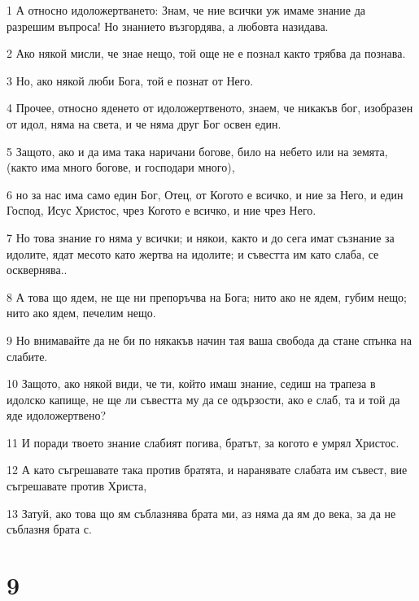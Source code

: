 \par 1 А относно идоложертването: Знам, че ние всички уж имаме знание да разрешим въпроса! Но знанието възгордява, а любовта назидава.
\par 2 Ако някой мисли, че знае нещо, той още не е познал както трябва да познава.
\par 3 Но, ако някой люби Бога, той е познат от Него.
\par 4 Прочее, относно яденето от идоложертвеното, знаем, че никакъв бог, изобразен от идол, няма на света, и че няма друг Бог освен един.
\par 5 Защото, ако и да има така наричани богове, било на небето или на земята, (както има много богове, и господари много),
\par 6 но за нас има само един Бог, Отец, от Когото е всичко, и ние за Него, и един Господ, Исус Христос, чрез Когото е всичко, и ние чрез Него.
\par 7 Но това знание го няма у всички; и някои, както и до сега имат съзнание за идолите, ядат месото като жертва на идолите; и съвестта им като слаба, се осквернява..
\par 8 А това що ядем, не ще ни препоръчва на Бога; нито ако не ядем, губим нещо; нито ако ядем, печелим нещо.
\par 9 Но внимавайте да не би по някакъв начин тая ваша свобода да стане спънка на слабите.
\par 10 Защото, ако някой види, че ти, който имаш знание, седиш на трапеза в идолско капище, не ще ли съвестта му да се одързости, ако е слаб, та и той да яде идоложертвено?
\par 11 И поради твоето знание слабият погива, братът, за когото е умрял Христос.
\par 12 А като съгрешавате така против братята, и наранявате слабата им съвест, вие съгрешавате против Христа,
\par 13 Затуй, ако това що ям съблазнява брата ми, аз няма да ям до века, за да не съблазня брата с.

\chapter{9}

